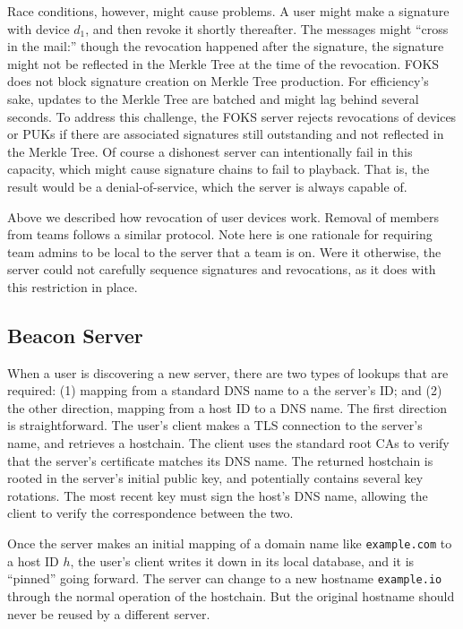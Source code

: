 Race conditions, however, might cause problems. A user might make a signature
with device $d_1$, and then revoke it shortly thereafter. The messages might
``cross in the mail:'' though the revocation happened after the signature, the
signature might not be reflected in the Merkle Tree at the time of the
revocation. FOKS does not block signature creation on Merkle Tree production.
For efficiency's sake, updates to the Merkle Tree are batched and might lag
behind several seconds. To address this challenge, the FOKS server
rejects revocations of devices or PUKs if there are associated signatures still
outstanding and not reflected in the Merkle Tree. Of course a dishonest server
can intentionally fail in this capacity, which might cause signature chains to
fail to playback. That is, the result would be a denial-of-service, which the
server is always capable of.

Above we described how revocation of user devices work. Removal of members from 
teams follows a similar protocol.  Note here is one rationale for requiring team
admins to be local to the server that a team is on. Were it otherwise, the
server could not carefully sequence signatures and revocations, as it does with
this restriction in place.

\subsection{Beacon Server}
\label{sec:beacon}

When a user is discovering a new server, there are two types of lookups that are
required: (1) mapping from a standard DNS name to a the server's ID; and (2) the
other direction, mapping from a host ID to a DNS name. The first direction is
straightforward.  The user's client makes a TLS connection to the server's name,
and retrieves a hostchain.  The client uses the standard root CAs to verify that
the server's certificate matches its DNS name. The returned hostchain is rooted
in the server's initial public key, and potentially contains several key
rotations. The most recent key must sign the host's DNS name, allowing the
client to verify the correspondence between the two. 

Once the server makes an initial mapping of a domain name like
\texttt{example.com} to a host ID $h$, the user's client writes it down in its
local database, and it is ``pinned'' going forward. The server can change to a
new hostname \texttt{example.io} through the normal operation of the
hostchain. But the original hostname should never be reused by a different
server.

